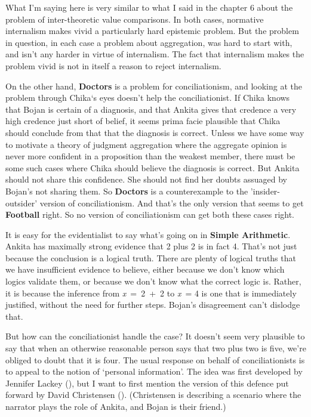 \documentclass[
  10pt,
  letterpaper,
  twoside]{scrbook}
\begin{document}
What I'm saying here is very similar to what I said in the chapter 6
about the problem of inter-theoretic value comparisons. In both cases,
normative internalism makes vivid a particularly hard epistemic problem.
But the problem in question, in each case a problem about aggregation,
was hard to start with, and isn't any harder in virtue of internalism.
The fact that internalism makes the problem vivid is not in itself a
reason to reject internalism.

On the other hand, \textbf{Doctors} is a problem for conciliationism,
and looking at the problem through {Chika}`s eyes doesn't help the
conciliationist. If {Chika} knows that {Bojan} is certain of a
diagnosis, and that {Ankita} gives that credence a very high credence
just short of belief, it seems prima facie plausible that {Chika} should
conclude from that that the diagnosis is correct. Unless we have some
way to motivate a theory of judgment aggregation where the aggregate
opinion is never more confident in a proposition than the weakest
member, there must be some such cases where {Chika} should believe the
diagnosis is correct. But {Ankita} should not share this confidence. She
should not find her doubts assuaged by {Bojan}'s not sharing them. So
\textbf{Doctors} is a counterexample to the 'insider-outsider' version
of conciliationism. And that's the only version that seems to get
\textbf{Football} right. So no version of conciliationism can get both
these cases right.

It is easy for the evidentialist to say what's going on in
\textbf{Simple Arithmetic}. {Ankita} has maximally strong evidence that
2 plus 2 is in fact 4. That's not just because the conclusion is a
logical truth. There are plenty of logical truths that we have
insufficient evidence to believe, either because we don't know which
logics validate them, or because we don't know what the correct logic
is. Rather, it is because the inference from \emph{x}~=~2~+~2 to
\emph{x}~= 4 is one that is immediately justified, without the need for
further steps. {Bojan}'s disagreement can't dislodge that.

But how can the conciliationist handle the case? It doesn't seem very
plausible to say that when an otherwise reasonable person says that two
plus two is five, we're obliged to doubt that it is four. The usual
response on behalf of conciliationists is to appeal to the notion of
`personal information'. The idea was first developed by Jennifer Lackey
(), but I want to first mention the
version of this defence put forward by David Christensen
(). (Christensen is describing a
scenario where the narrator plays the role of Ankita, and Bojan is their
friend.)
\end{document}
